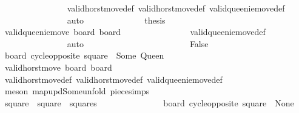 \begin{isabellebody}
\ \ \ \ \ \ \ \ \ \ \ \ \ \ \isamarkupfalse%
\ valid{\isacharunderscore}horst{\isacharunderscore}move{\isacharunderscore}def\ valid{\isacharunderscore}horst{\isacharunderscore}move{\isacharprime}{\isacharunderscore}def\ valid{\isacharunderscore}queenie{\isacharunderscore}move{\isacharunderscore}def\isanewline
\ \ \ \ \ \ \ \ \ \ \ \ \ \ \isamarkupfalse%
\ auto\isanewline
\ \ \ \ \ \ \ \ \ \ \ \ \isamarkupfalse%
\ {\isacharquery}thesis\isanewline
\ \ \ \ \ \ \ \ \ \ \ \ \ \ \isamarkupfalse%
\ {\isacharbackquoteopen}valid{\isacharunderscore}queenie{\isacharunderscore}move\ board{\isacharprime}\ board{\isacharprime}{\isacharprime}{\isacharbackquoteclose}\isanewline
\ \ \ \ \ \ \ \ \ \ \ \ \ \ \isamarkupfalse%
\ valid{\isacharunderscore}queenie{\isacharunderscore}move{\isacharunderscore}def\isanewline
\ \ \ \ \ \ \ \ \ \ \ \ \ \ \isamarkupfalse%
\ auto\isanewline
\ \ \ \ \ \ \ \ \ \ \isamarkupfalse%
\isanewline
\ \ \ \ \ \ \ \ \ \ \ \ \isamarkupfalse%
\ False\isanewline
\ \ \ \ \ \ \ \ \ \ \ \ \isamarkupfalse%
\ {\isachardoublequoteopen}board{\isacharprime}\ {\isacharparenleft}cycle{\isacharunderscore}opposite\ square{\isacharparenright}\ {\isasymnoteq}\ Some\ Queen{\isachardoublequoteclose}\isanewline
\ \ \ \ \ \ \ \ \ \ \ \ \ \ \isamarkupfalse%
\ {\isacharbackquoteopen}valid{\isacharunderscore}horst{\isacharunderscore}move\ board\ board{\isacharprime}{\isacharbackquoteclose}\isanewline
\ \ \ \ \ \ \ \ \ \ \ \ \ \ \isamarkupfalse%
\ valid{\isacharunderscore}horst{\isacharunderscore}move{\isacharunderscore}def\ valid{\isacharunderscore}horst{\isacharunderscore}move{\isacharprime}{\isacharunderscore}def\ valid{\isacharunderscore}queenie{\isacharunderscore}move{\isacharunderscore}def\isanewline
\ \ \ \ \ \ \ \ \ \ \ \ \ \ \isamarkupfalse%
\ {\isacharparenleft}meson\ map{\isacharunderscore}upd{\isacharunderscore}Some{\isacharunderscore}unfold\ piece{\isachardot}simps{\isacharparenleft}{}{\isacharparenright}{\isacharparenright}\isanewline
\ \ \ \ \ \ \ \ \ \ \ \ \isamarkupfalse%
\ square{\isacharprime}\ \ {\isachardoublequoteopen}square{\isacharprime}\ {\isasymin}\ squares{\isachardoublequoteclose}\ \isanewline
\ \ \ \ \ \ \ \ \ \ \ \ \ \ {\isachardoublequoteopen}board{\isacharprime}\ {\isacharparenleft}cycle{\isacharunderscore}opposite\ square{\isacharprime}{\isacharparenright}\ {\isacharequal}\ None{\isachardoublequoteclose}\ \isanewline

\end{isabellebody}
